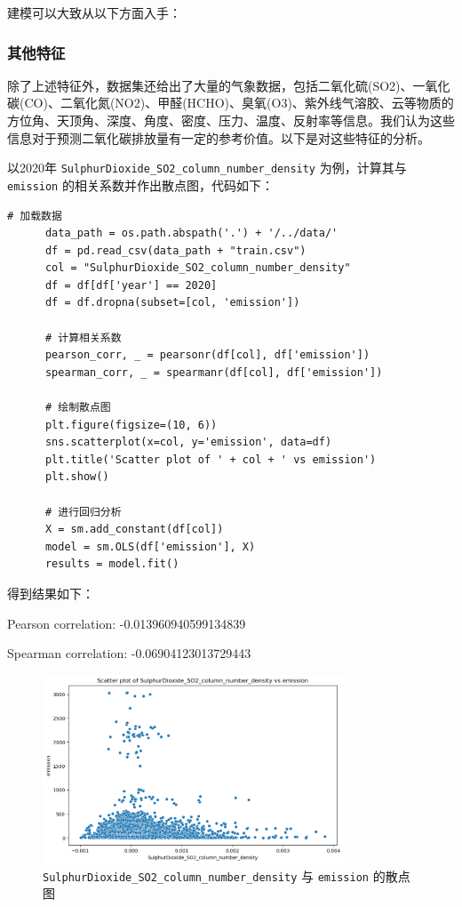 \documentclass{ctexart}
\begin{document}
建模可以大致从以下方面入手：

\subsubsection{其他特征}

除了上述特征外，数据集还给出了大量的气象数据，包括二氧化硫(SO2)、一氧化碳(CO)、二氧化氮(NO2)、甲醛(HCHO)、臭氧(O3)、紫外线气溶胶、云等物质的方位角、天顶角、深度、角度、密度、压力、温度、反射率等信息。我们认为这些信息对于预测二氧化碳排放量有一定的参考价值。以下是对这些特征的分析。

以2020年 \texttt{SulphurDioxide\_SO2\_column\_number\_density} 为例，计算其与 \texttt{emission} 的相关系数并作出散点图，代码如下：

\begin{lstlisting}[style=Python]
      # 加载数据
      data_path = os.path.abspath('.') + '/../data/'
      df = pd.read_csv(data_path + "train.csv")
      col = "SulphurDioxide_SO2_column_number_density"
      df = df[df['year'] == 2020]
      df = df.dropna(subset=[col, 'emission'])
      
      # 计算相关系数
      pearson_corr, _ = pearsonr(df[col], df['emission'])
      spearman_corr, _ = spearmanr(df[col], df['emission'])
      
      # 绘制散点图
      plt.figure(figsize=(10, 6))
      sns.scatterplot(x=col, y='emission', data=df)
      plt.title('Scatter plot of ' + col + ' vs emission')
      plt.show()
      
      # 进行回归分析
      X = sm.add_constant(df[col])
      model = sm.OLS(df['emission'], X)
      results = model.fit()
\end{lstlisting}

得到结果如下：

\begin{center}
Pearson correlation: -0.013960940599134839

Spearman correlation: -0.06904123013729443
\end{center}


\begin{figure}[H]
      \centering
      \includegraphics[width=0.8\textwidth]{output1.png}
      \caption{\texttt{SulphurDioxide\_SO2\_column\_number\_density} 与 \texttt{emission} 的散点图}
\end{figure}
\end{document}
